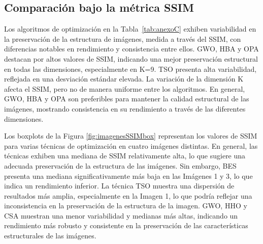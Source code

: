 \documentclass[conference]{IEEEtran}
\begin{document}
\subsection{Comparación bajo la métrica SSIM}

\noindent Los algoritmos de optimización en la Tabla~\ref{tab:anexoC} exhiben variabilidad en la preservación de la estructura de imágenes, medida a través del SSIM, con diferencias notables en rendimiento y consistencia entre ellos. GWO, HBA y OPA destacan por altos valores de SSIM, indicando una mejor preservación estructural en todas las dimensiones, especialmente en K=9. TSO presenta alta variabilidad, reflejada en una desviación estándar elevada. La variación de la dimensión K afecta el SSIM, pero no de manera uniforme entre los algoritmos. En general, GWO, HBA y OPA son preferibles para mantener la calidad estructural de las imágenes, mostrando consistencia en su rendimiento a través de las diferentes dimensiones.

\noindent Los boxplots de la Figura \ref{fig:imagenesSSIMbox} representan los valores de SSIM para varias técnicas de optimización en cuatro imágenes distintas. En general, las técnicas exhiben una mediana de SSIM relativamente alta, lo que sugiere una adecuada preservación de la estructura de las imágenes. Sin embargo, BES presenta una mediana significativamente más baja en las Imágenes 1 y 3, lo que indica un rendimiento inferior. La técnica TSO muestra una dispersión de resultados más amplia, especialmente en la Imagen 1, lo que podría reflejar una inconsistencia en la preservación de la estructura de la imagen. GWO, HHO y CSA muestran una menor variabilidad y medianas más altas, indicando un rendimiento más robusto y consistente en la preservación de las características estructurales de las imágenes.
\end{document}
